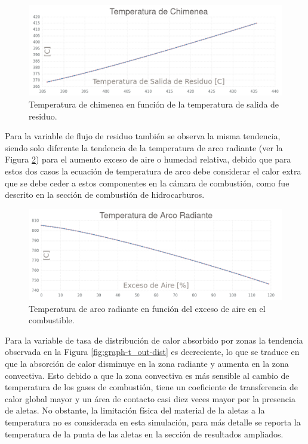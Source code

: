 \begin{figure}[hbt]
\begin{center}
\includegraphics[scale=0.38]{images/graph-t_out-chim}
\caption[Temperatura de chimenea vs Temperatura de salida de residuo]{Temperatura de chimenea en función de la temperatura de salida de residuo.}
\label{fig:graph-t_out-chim}
\end{center}
\end{figure}

\par Para la variable de flujo de residuo también se observa la misma tendencia, siendo solo diferente la tendencia de la temperatura de arco radiante (ver la Figura \ref{fig:graph-air_excess-arc}) para el aumento exceso de aire o humedad relativa, debido que para estos dos casos la ecuación de temperatura de arco debe considerar el calor extra que se debe ceder a estos componentes en la cámara de combustión, como fue descrito en la sección de combustión de hidrocarburos.

\begin{figure}[hbt]
\begin{center}
\includegraphics[scale=0.38]{images/graph-air_excess-arc}
\caption[Temperatura de arco radiante vs Exceso de aire]{Temperatura de arco radiante en función del exceso de aire en el combustible.}
\label{fig:graph-air_excess-arc}
\end{center}
\end{figure}

\par Para la variable de tasa de distribución de calor absorbido por zonas la tendencia observada en la Figura \ref{fig:graph-t_out-dist} es decreciente, lo que se traduce en que la absorción de calor disminuye en la zona radiante y aumenta en la zona convectiva. Esto debido a que la zona convectiva es más sensible al cambio de temperatura de los gases de combustión, tiene un coeficiente de transferencia de calor global mayor y un área de contacto casi diez veces mayor por la presencia de aletas. No obstante, la limitación física del material de la aletas a la temperatura no es considerada en esta simulación, para más detalle se reporta la temperatura de la punta de las aletas en la sección de resultados ampliados.

